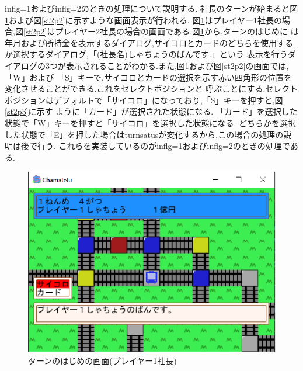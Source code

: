 \documentclass[a4j]{jarticle}
\begin{document}
    inflg=1およびinflg=2のときの処理について説明する. 社長のターンが始まると図\ref{st2p1}および図\ref{st2p2}に示すような画面表示が行われる.
    図\ref{st2p1}はプレイヤー1社長の場合,図\ref{st2p2}はプレイヤー2社長の場合の画面である.図\ref{st2p1}から,ターンのはじめに
    は年月および所持金を表示するダイアログ,サイコロとカードのどちらを使用するか選択するダイアログ,「(社長名)しゃちょうのばんです.」という
    表示を行うダイアログの3つが表示されることがわかる.また,図\ref{st2p1}および図\ref{st2p2}の画面では,「W」および
    「S」キーで,サイコロとカードの選択を示す赤い四角形の位置を変化させることができる.これをセレクトポジションと
    呼ぶことにする.セレクトポジションはデフォルトで「サイコロ」になっており,「S」キーを押すと,図\ref{st2p3}に示す
    ように「カード」が選択された状態になる. 「カード」を選択した状態で「W」キーを押すと「サイコロ」を選択した状態になる.
    どちらかを選択した状態で「E」を押した場合はturnsatusが変化するから,この場合の処理の説明は後で行う.
    これらを実装しているのがinflg=1およびinflg=2のときの処理である.

    \begin{figure}[H]
        \centering
        \includegraphics[scale=1.3]{st2p1.eps}
        \caption{ターンのはじめの画面(プレイヤー1社長)}
         \label{st2p1}
        \end{figure} 
\end{document}
